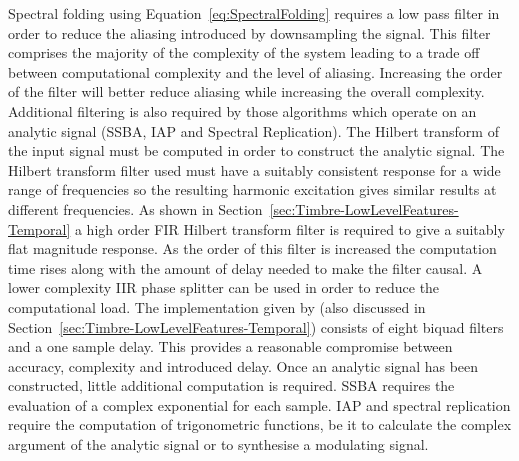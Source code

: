 		Spectral folding using Equation~\ref{eq:SpectralFolding} requires a low pass filter in order to reduce the
		aliasing introduced by downsampling the signal. This filter comprises the majority of the complexity of the
		system leading to a trade off between computational complexity and the level of aliasing. Increasing the
		order of the filter will better reduce aliasing while increasing the overall complexity. Additional
		filtering is also required by those algorithms which operate on an analytic signal (SSBA, IAP and Spectral
		Replication). The Hilbert transform of the input signal must be computed in order to construct the analytic
		signal. The Hilbert transform filter used must have a suitably consistent response for a wide range of
		frequencies so the resulting harmonic excitation gives similar results at different frequencies. As shown
		in Section~\ref{sec:Timbre-LowLevelFeatures-Temporal} a high order FIR Hilbert transform filter is required
		to give a suitably flat magnitude response. As the order of this filter is increased the computation time
		rises along with the amount of delay needed to make the filter causal. A lower complexity IIR phase
		splitter can be used in order to reduce the computational load. The implementation given by
		\citet{niemitalo2003hilbert} (also discussed in Section~\ref{sec:Timbre-LowLevelFeatures-Temporal})
		consists of eight biquad filters and a one sample delay. This provides a reasonable compromise between
		accuracy, complexity and introduced delay.  Once an analytic signal has been constructed, little additional
		computation is required. SSBA requires the evaluation of a complex exponential for each sample. IAP and
		spectral replication require the computation of trigonometric functions, be it to calculate the complex
		argument of the analytic signal or to synthesise a modulating signal.

